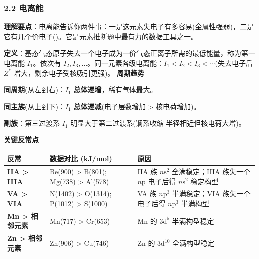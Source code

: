 \subsubsection{2.2 电离能}\label{ux7535ux79bbux80fd}

\textbf{理解要点}：电离能告诉你两件事：一是这元素失电子有多容易(金属性强弱)，二是它有几个价电子()。它是元素推断题中最有力的数据工具之一。

\textbf{定义}：基态气态原子失去一个电子成为一价气态正离子所需的最低能量，称为第一电离能 \(I_1\)。依次有 \(I_2, I_3, \dots\)。同一元素各级电离能：\(I_1 < I_2 < I_3 < \cdots\)(失去电子后 \(Z^*\) 增大，剩余电子受核吸引更强)。
\textbf{周期趋势}

\textbf{同周期}(从左到右)：\(I_1\) \textbf{总体递增}，稀有气体最大。

\textbf{同主族}(从上到下)：\(I_1\) \textbf{总体递减}(电子层数增加 \textgreater{} 核电荷增加)。

\textbf{副族}：第三过渡系 \(I_1\) 明显大于第二过渡系(镧系收缩 \箭 半径相近但核电荷大增)。

\textbf{关键反常点}

{\def\LTcaptype{none} %
\begin{longtable}[]{@{}
  >{\raggedright\arraybackslash}p{}
  >{\raggedright\arraybackslash}p{}
  >{\raggedright\arraybackslash}p{}@{}}
\toprule\noalign{}
\begin{minipage}[b]{\linewidth}\raggedright
反常
\end{minipage} & \begin{minipage}[b]{\linewidth}\raggedright
数据对比 (kJ/mol)
\end{minipage} & \begin{minipage}[b]{\linewidth}\raggedright
原因
\end{minipage} \\
\midrule\noalign{}
\endhead
\bottomrule\noalign{}
\endlastfoot
\textbf{IIA \textgreater{} IIIA} & Be(900) \textgreater{} B(801); Mg(738) \textgreater{} Al(578) & IIA 族 \(n\mathrm{s}^2\) 全满稳定；IIIA 族失一个 \(n\mathrm{p}\) 电子后得 \(n\mathrm{s}^2\) 稳定构型 \\
\textbf{VA \textgreater{} VIA} & N(1402) \textgreater{} O(1314); P(1012) \textgreater{} S(1000) & VA 族 \(n\mathrm{p}^3\) 半满稳定；VIA 族失一个电子后得 \(n\mathrm{p}^3\) 半满构型 \\
\textbf{Mn \textgreater{} 相邻元素} & Mn(717) \textgreater{} Cr(653) & Mn 的 \(3\mathrm{d}^5\) 半满构型稳定 \\
\textbf{Zn \textgreater{} 相邻元素} & Zn(906) \textgreater{} Cu(746) & Zn 的 \(3\mathrm{d}^{10}\) 全满构型稳定 \\
\end{longtable}
}

